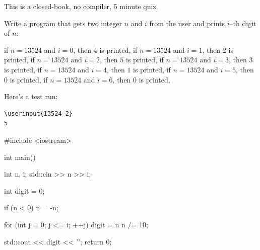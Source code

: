 

This is a closed-book, no compiler, 5 minute quiz.

\nextq
Write a program that gets two integer $n$ and $i$ from the user
and prints $i$--th digit of $n$:
\begin{itemize}[nosep]
\li if $n = 13524$ and $i = 0$, then $4$ is printed,
\li if $n = 13524$ and $i = 1$, then $2$ is printed,
\li if $n = 13524$ and $i = 2$, then $5$ is printed,
\li if $n = 13524$ and $i = 3$, then $3$ is printed,
\li if $n = 13524$ and $i = 4$, then $1$ is printed,
\li if $n = 13524$ and $i = 5$, then $0$ is printed,
\li if $n = 13524$ and $i = 6$, then $0$ is printed,
\end{itemize}
Here's a test run:
\vspace{-5pt}
\begin{Verbatim}[fontsize=\footnotesize,commandchars=\\\{\},frame=single]
\userinput{13524 2}
5
\end{Verbatim}
\ANSWER
\begin{answercode}
#include <iostream>

int main()
{
    int n, i;
    std::cin >> n >> i;

    int digit = 0;

    if (n < 0)
    {
        n = -n;
    }

    for (int j = 0; j <= i; ++j)
    {
        digit = n %
        n /= 10;
    }

    std::cout << digit << '\n';
    return 0;
}

\end{answercode}

